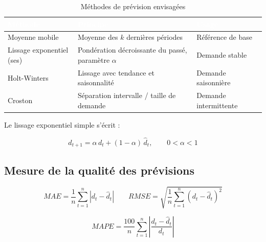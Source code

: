 \begin{table}[H]
  \centering
  \caption{Méthodes de prévision envisagées}
  \label{tab:methodes_prevision}
  \renewcommand{\arraystretch}{1.4}
  \begin{tabularx}{\textwidth}{|l|X|l|}
    \hline
    \rowcolor{iacsTableHead}
    \textcolor{white}{\textbf{Méthode}} &
    \textcolor{white}{\textbf{Principe}} &
    \textcolor{white}{\textbf{Usage}} \\
    \hline
    Moyenne mobile &
    Moyenne des $k$ dernières périodes &
    Référence de base \\
    \hline
    \rowcolor{iacsLightGray}
    Lissage exponentiel (\gls{ses}) &
    Pondération décroissante du passé, paramètre $\alpha$ &
    Demande stable \\
    \hline
    Holt-Winters &
    Lissage avec tendance et saisonnalité &
    Demande saisonnière \\
    \hline
    \rowcolor{iacsLightGray}
    Croston &
    Séparation intervalle / taille de demande &
    Demande intermittente \\
    \hline
  \end{tabularx}
\end{table}

Le lissage exponentiel simple s'écrit :

\begin{equation}
  \hat{d}_{t+1} = \alpha \, d_{t} + (1 - \alpha) \, \hat{d}_{t},
  \qquad 0 < \alpha < 1
  \label{eq:ses}
\end{equation}

\subsection{Mesure de la qualité des prévisions}

\begin{equation}
  MAE = \frac{1}{n}\sum_{t=1}^{n} \left| d_{t} - \hat{d}_{t} \right|
  \qquad
  RMSE = \sqrt{\frac{1}{n}\sum_{t=1}^{n} \left( d_{t} - \hat{d}_{t} \right)^{2}}
  \label{eq:erreurs}
\end{equation}

\begin{equation}
  MAPE = \frac{100}{n}\sum_{t=1}^{n}
    \left| \frac{d_{t} - \hat{d}_{t}}{d_{t}} \right|
  \label{eq:mape}
\end{equation}


